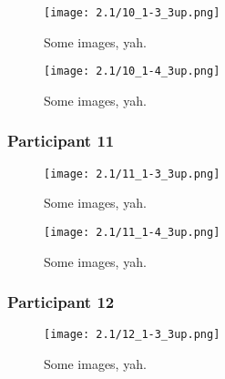 \begin{figure}[h]
	\begin{center}
	\texttt{[image: 2.1/10\_1-3\_3up.png]}
	\caption{Some images, yah.}
	\end{center}
\end{figure}

\clearpage

\begin{figure}[h]
	\begin{center}
	\texttt{[image: 2.1/10\_1-4\_3up.png]}
	\caption{Some images, yah.}
	\end{center}
\end{figure}


\clearpage

\subsubsection{Participant 11}

\begin{figure}[h]
	\begin{center}
	\texttt{[image: 2.1/11\_1-3\_3up.png]}
	\caption{Some images, yah.}
	\end{center}
\end{figure}

\clearpage

\begin{figure}[h]
	\begin{center}
	\texttt{[image: 2.1/11\_1-4\_3up.png]}
	\caption{Some images, yah.}
	\end{center}
\end{figure}


\clearpage

\subsubsection{Participant 12}

\begin{figure}[h]
	\begin{center}
	\texttt{[image: 2.1/12\_1-3\_3up.png]}
	\caption{Some images, yah.}
	\end{center}
\end{figure}


